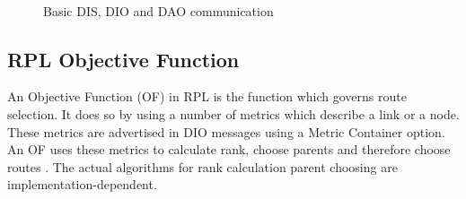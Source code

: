 \begin{figure}[htbp]
  \begin{center}
    \leavevmode
    \\
    \caption{Basic DIS, DIO and DAO communication}
    \label{fig:DIS/DIO/DAO}
  \end{center}
\end{figure}

\subsection{RPL Objective Function}
\label{RPL:OF}
An Objective Function (OF) in RPL is the function which governs route selection. It does so by using a number of metrics which describe a link or a node. These metrics are advertised in DIO messages using a Metric Container option. An OF uses these metrics to calculate rank, choose parents and therefore choose routes \cite{MRHOF}. The actual algorithms for rank calculation parent choosing are implementation-dependent.

